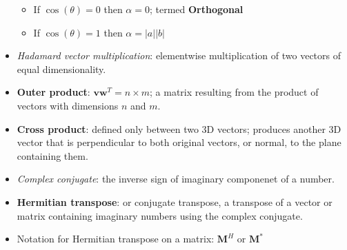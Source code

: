 \documentclass[12pt,a4paper]{article}
\begin{document}
\begin{itemize}
\begin{itemize}
            \item If \(\cos(\theta) = 0\) then \(\alpha = 0\); termed \textbf{Orthogonal}
            \item If \(\cos(\theta) = 1\) then \(\alpha = |a||b|\)
        \end{itemize}
    \item \textit{Hadamard vector multiplication}: elementwise multiplication of two vectors of equal dimensionality.
    \item \textbf{Outer product}: {\color{o-Sun}\(\bm{vw}^T = n \times m\)}; a matrix resulting from the product of vectors with dimensions \(n\) and \(m\).
    \item \textbf{Cross product}: defined only between {\color{o-Sun}two 3D} vectors; produces another 3D vector that is perpendicular to both original vectors, or {\color{o-Sun}normal}, to the plane containing them.
    \item \textit{Complex conjugate}: the inverse sign of imaginary componenet of a number.
    \item \textbf{Hermitian transpose}: or conjugate transpose, a transpose of a vector or matrix containing imaginary numbers using the complex conjugate. 
    \item Notation for Hermitian transpose on a matrix: \(\bm{M}^H\) or \(\bm{M}^*\)
\end{itemize}
\end{document}
